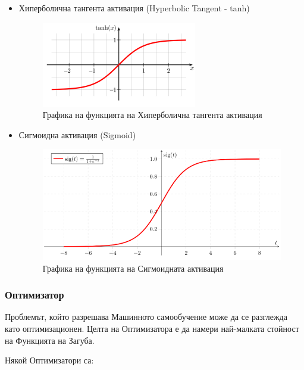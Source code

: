 \documentclass{article}
\begin{document}
\begin{itemize}
  \item Хиперболична тангента активация (Hyperbolic Tangent - tanh)

    \begin{figure}[H]
      \centering
      \captionsetup{justification=centering}
      \includegraphics[width=256px, keepaspectratio]{chapter-03/tanh.png}
      \caption{Графика на функцията на Хиперболична тангента активация}
    \end{figure}

  \item Сигмоидна активация (Sigmoid)

    \begin{figure}[H]
      \centering
      \captionsetup{justification=centering}
      \includegraphics{chapter-03/sigmoid.png}
      \caption{Графика на функцията на Сигмоидната активация}
    \end{figure}

\end{itemize}

\subsubsection{Оптимизатор}

Проблемът, който разрешава Машинното самообучение може да се разглежда като оптимизационен. Целта на Оптимизатора е да
намери най-малката стойност на Функцията на Загуба. \cite{deep-learning-practitioner}

Някой Оптимизатори са:
\end{document}
